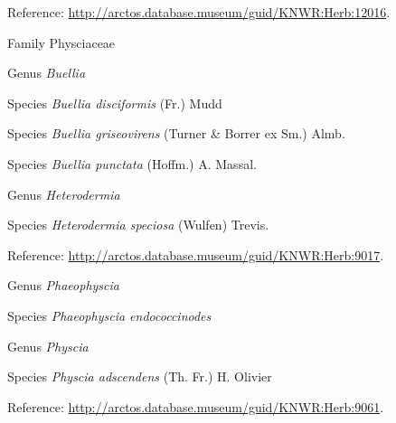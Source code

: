 \documentclass[9pt, article]{memoir}
\begin{document}
\begin{multicols}{2}
\vspace{6pt}Reference: 
\url{http://arctos.database.museum/guid/KNWR:Herb:12016}.

\vspace{6pt}\noindent\hspace{24pt}Family Physciaceae


\vspace{6pt}\noindent\hspace{30pt}Genus \textit{Buellia}


\vspace{6pt}\noindent\hspace{36pt}Species \textit{Buellia disciformis} (Fr.) Mudd


\vspace{6pt}\noindent\hspace{36pt}Species \textit{Buellia griseovirens} (Turner \& Borrer ex Sm.) Almb.


\vspace{6pt}\noindent\hspace{36pt}Species \textit{Buellia punctata} (Hoffm.) A. Massal.


\vspace{6pt}\noindent\hspace{30pt}Genus \textit{Heterodermia}


\vspace{6pt}\noindent\hspace{36pt}Species \textit{Heterodermia speciosa} (Wulfen) Trevis.


\vspace{6pt}Reference: 
\url{http://arctos.database.museum/guid/KNWR:Herb:9017}.

\vspace{6pt}\noindent\hspace{30pt}Genus \textit{Phaeophyscia}


\vspace{6pt}\noindent\hspace{36pt}Species \textit{Phaeophyscia endococcinodes}


\vspace{6pt}\noindent\hspace{30pt}Genus \textit{Physcia}


\vspace{6pt}\noindent\hspace{36pt}Species \textit{Physcia adscendens} (Th. Fr.) H. Olivier


\vspace{6pt}Reference: 
\url{http://arctos.database.museum/guid/KNWR:Herb:9061}.


\end{multicols}
\end{document}
